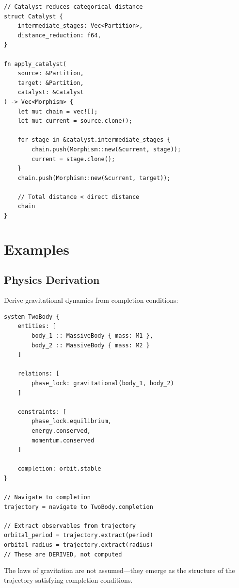 \documentclass[twocolumn,10pt]{article}
\theoremstyle{remark}
\begin{document}
\begin{lstlisting}
// Catalyst reduces categorical distance
struct Catalyst {
    intermediate_stages: Vec<Partition>,
    distance_reduction: f64,
}

fn apply_catalyst(
    source: &Partition,
    target: &Partition,
    catalyst: &Catalyst
) -> Vec<Morphism> {
    let mut chain = vec![];
    let mut current = source.clone();

    for stage in &catalyst.intermediate_stages {
        chain.push(Morphism::new(&current, stage));
        current = stage.clone();
    }
    chain.push(Morphism::new(&current, target));

    // Total distance < direct distance
    chain
}
\end{lstlisting}

\section{Examples}
\label{sec:examples}

\subsection{Physics Derivation}

Derive gravitational dynamics from completion conditions:

\begin{lstlisting}
system TwoBody {
    entities: [
        body_1 :: MassiveBody { mass: M1 },
        body_2 :: MassiveBody { mass: M2 }
    ]

    relations: [
        phase_lock: gravitational(body_1, body_2)
    ]

    constraints: [
        phase_lock.equilibrium,
        energy.conserved,
        momentum.conserved
    ]

    completion: orbit.stable
}

// Navigate to completion
trajectory = navigate to TwoBody.completion

// Extract observables from trajectory
orbital_period = trajectory.extract(period)
orbital_radius = trajectory.extract(radius)
// These are DERIVED, not computed
\end{lstlisting}

The laws of gravitation are not assumed---they emerge as the structure of the trajectory satisfying completion conditions.
\end{document}
